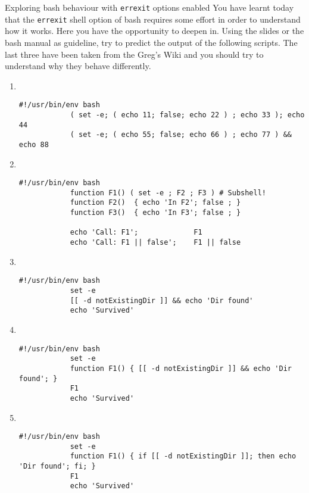 
\begin{exercise}[Instructive]{Exploring bash behaviour with \texttt{errexit} options enabled}
    You have learnt today that the \texttt{errexit} shell option of bash requires some effort in order to understand how it works.
    Here you have the opportunity to deepen in.
    Using the slides or the bash manual as guideline, try to predict the output of the following scripts.
    The last three have been taken from the Greg's Wiki and you should try to understand why they behave differently.
    \begin{enumerate}
        \item ~
        \begin{lstlisting}[style=myBash, numbers=none]
            #!/usr/bin/env bash
            ( set -e; ( echo 11; false; echo 22 ) ; echo 33 ); echo 44
            ( set -e; ( echo 55; false; echo 66 ) ; echo 77 ) && echo 88
        \end{lstlisting}
        \item ~
        \begin{lstlisting}[style=myBash, numbers=none]
            #!/usr/bin/env bash
            function F1() ( set -e ; F2 ; F3 ) # Subshell!
            function F2()  { echo 'In F2'; false ; }
            function F3()  { echo 'In F3'; false ; }

            echo 'Call: F1';             F1
            echo 'Call: F1 || false';    F1 || false
        \end{lstlisting}
        \item ~
        \begin{lstlisting}[style=myBash, numbers=none]
            #!/usr/bin/env bash
            set -e
            [[ -d notExistingDir ]] && echo 'Dir found'
            echo 'Survived'
        \end{lstlisting}
        \item ~
        \begin{lstlisting}[style=myBash, numbers=none]
            #!/usr/bin/env bash
            set -e
            function F1() { [[ -d notExistingDir ]] && echo 'Dir found'; }
            F1
            echo 'Survived'
        \end{lstlisting}
        \item ~
        \begin{lstlisting}[style=myBash, numbers=none]
            #!/usr/bin/env bash
            set -e
            function F1() { if [[ -d notExistingDir ]]; then echo 'Dir found'; fi; }
            F1
            echo 'Survived'
        \end{lstlisting}
    \end{enumerate}
\end{exercise}